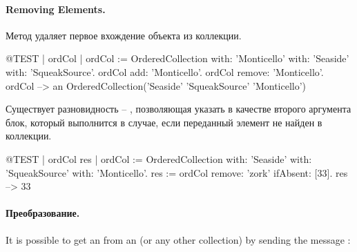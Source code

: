\documentclass[a4paper,10pt,twoside]{book}
\begin{document}
\paragraph{Removing Elements.} Метод   удаляет первое вхождение объекта из коллекции.

\begin{code}{@TEST | ordCol | ordCol := OrderedCollection with: 'Monticello' with: 'Seaside' with: 'SqueakSource'.}
ordCol add: 'Monticello'.
ordCol remove: 'Monticello'.
ordCol --> an OrderedCollection('Seaside' 'SqueakSource' 'Monticello')
\end{code}

Существует разновидность  -- , позволяющая указать
в качестве второго аргумента блок, который выполнится в случае, если переданный элемент не найден в коллекции.

\begin{code}{@TEST | ordCol res | ordCol := OrderedCollection with: 'Seaside' with: 'SqueakSource' with: 'Monticello'.}
res := ordCol remove: 'zork' ifAbsent: [33].
res --> 33
\end{code}

\paragraph{Преобразование.}
It is possible to get an  from an  (or any other collection) by sending the message :

\end{document}
